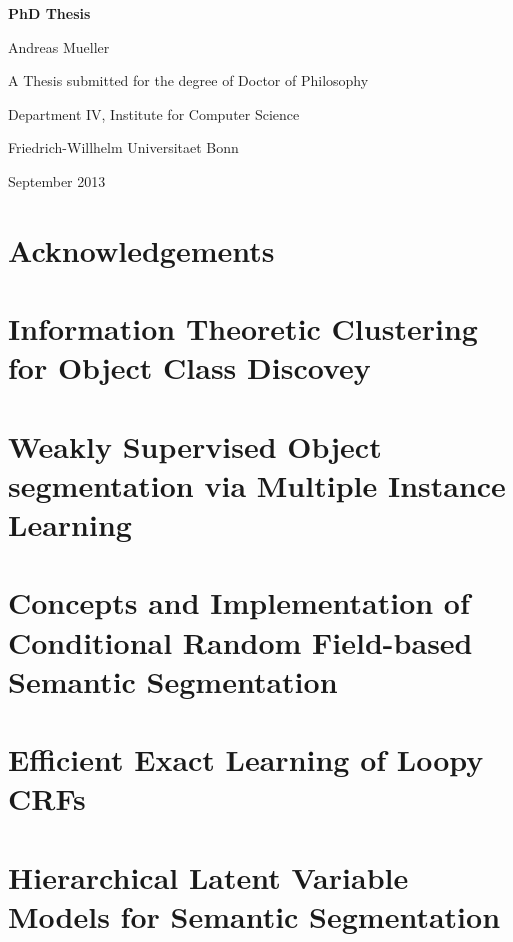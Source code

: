 \documentclass[12pt,toc=bibnumbered, a4paper,twoside]{scrreprt}
\begin{document}


\begin{titlepage}
\begin{center}
\vspace*{1in}
\textbf{{\LARGE PhD Thesis}}
\par
\vspace{1.5in} {\large Andreas Mueller}
 \par \vfill A Thesis submitted for the degree of Doctor of Philosophy
\par \vspace{0.5in}
Department IV, Institute for Computer Science
\par \vspace{0.5in}
Friedrich-Willhelm Universitaet Bonn \par
\vspace{0.5in} September 2013 \end{center}

\end{titlepage}


\tableofcontents

\chapter*{Acknowledgements}

\begin{abstract} abstract
\end{abstract}



\chapter{Information Theoretic Clustering for Object Class Discovey}


\chapter{Weakly Supervised Object segmentation via Multiple Instance Learning}



\chapter{Concepts and Implementation of Conditional Random Field-based Semantic Segmentation}



\chapter{Efficient Exact Learning of Loopy CRFs}



\chapter{Hierarchical Latent Variable Models for Semantic Segmentation}


\end{document}
